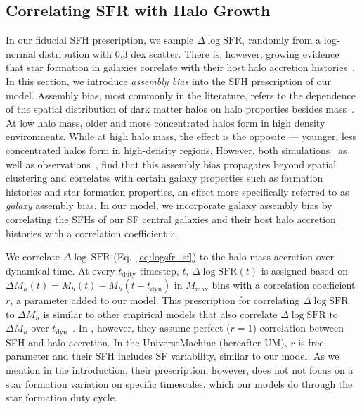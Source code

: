 \documentclass[12pt, letterpaper, preprint, tighten]{aastex62}
\newcommand{\logsfr}{\log\mathrm{SFR}}
\begin{document}
\subsection{Correlating SFR with Halo Growth}
In our fiducial SFH prescription, we sample $\Delta \logsfr_i$ randomly from a
log-normal distribution with $0.3$ dex scatter. There is, however, growing evidence 
that star formation in galaxies correlate with their host halo accretion 
histories~\citep[\emph{e.g.}][]{lim2016, tojeiro2017, tinker2018b}.
In this section, we introduce \emph{assembly bias} into the SFH prescription of our 
model. Assembly bias, most commonly in the literature, refers to the dependence of the
spatial distribution of dark matter halos on halo properties besides
mass~\citep{gao2005,wechsler2006,gao2007,wetzel2007,li2008,sunayama2016}.
At low halo mass, older and more concentrated halos form in high density environments.
While at high halo mass, the effect is the opposite --- younger, less concentrated
halos form in high-density regions. However, both
simulations~\citep{croton2007, artale2018, zehavi2018} as well as
observations~\citep{yang2006,wang2008,tinker2011,wang2013,lacerna2014,calderon2018,tinker2018},
find that this assembly bias propagates beyond spatial clustering and correlates
with certain galaxy properties such as formation histories and star formation
properties, an effect more specifically referred to as {\em galaxy} assembly bias.
In our model, we incorporate galaxy assembly bias by correlating the SFHs
of our SF central galaxies and their host halo accretion histories
with a correlation coefficient $r$.

We correlate $\Delta\log\,\mathrm{SFR}$ (Eq.~\ref{eq:logsfr_sf}) to the halo 
mass accretion over dynamical time. At every $t_\mathrm{duty}$ timestep, $t$, $
\Delta\logsfr(t)$ is assigned based on 
$\Delta M_h(t) = M_h(t) - M_h(t - t_\mathrm{dyn})$ in $M_\mathrm{max}$ bins
with a correlation coefficient $r$, a parameter added to our model. This
prescription for correlating $\Delta\log\mathrm{SFR}$ to $\Delta M_h$ is
similar to other empirical models that also correlate $\Delta\log\mathrm{SFR}$
to $\Delta M_h$ over $t_\mathrm{dyn}$~\citep{rodriguez-puebla2016a, behroozi2019}.
In \cite{rodriguez-puebla2016a}, however, they assume perfect ($r=1$) correlation
between SFH and halo accretion. In the \cite{behroozi2019} {\sc UniverseMachine}
(hereafter UM), $r$ is free parameter and their SFH includes SF variability,
similar to our model. As we mention in the introduction, their prescription,
however, does not not focus on a star formation variation on specific timescales,
which our models do through the star formation duty cycle.
\end{document}
